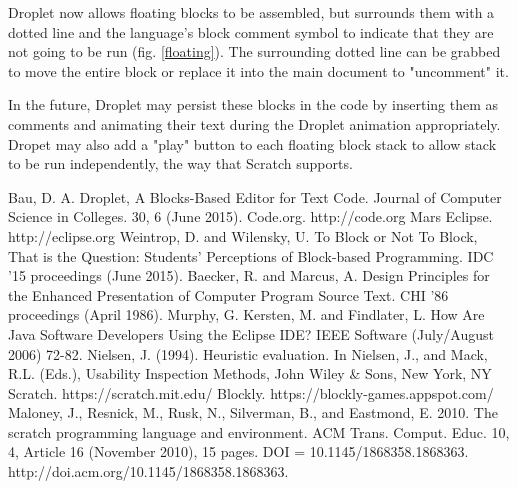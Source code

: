 \documentclass[conference]{IEEEtran}
\begin{document}
Droplet now allows floating blocks to be assembled, but surrounds them with a dotted line and the language's block comment symbol to indicate that they are not going to be run (fig. \ref{floating}). The surrounding dotted line can be grabbed to move the entire block or replace it into the main document to "uncomment" it.

In the future, Droplet may persist these blocks in the code by inserting them as comments and animating their text during the Droplet animation appropriately. Dropet may also add a "play" button to each floating block stack to allow stack to be run independently, the way that Scratch supports.

\begin{thebibliography}{1}

  Bau, D. A. Droplet, A Blocks-Based Editor for Text Code. Journal of Computer Science in Colleges. 30, 6 (June 2015).
  Code.org. http://code.org
  Mars Eclipse. http://eclipse.org
  Weintrop, D. and Wilensky, U. To Block or Not To Block, That is the Question: Students' Perceptions of Block-based Programming. IDC '15 proceedings (June 2015).
  Baecker, R. and Marcus, A. Design Principles for the Enhanced Presentation of Computer Program Source Text. CHI '86 proceedings (April 1986).
  Murphy, G. Kersten, M. and Findlater, L. How Are Java Software Developers Using the Eclipse IDE? IEEE Software (July/August 2006) 72-82.
  Nielsen, J. (1994). Heuristic evaluation. In Nielsen, J., and Mack, R.L. (Eds.), Usability Inspection Methods, John Wiley \& Sons, New York, NY
  Scratch. https://scratch.mit.edu/
  Blockly. https://blockly-games.appspot.com/
  Maloney, J., Resnick, M., Rusk, N., Silverman, B., and Eastmond, E. 2010. The scratch programming language and environment. ACM Trans. Comput. Educ. 10, 4, Article 16 (November 2010), 15 pages. DOI = 10.1145/1868358.1868363. http://doi.acm.org/10.1145/1868358.1868363.

\end{thebibliography}

\end{document}
